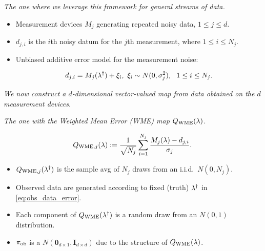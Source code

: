 \begin{frame}[t]{\it The one where we leverage this framework for general streams of data.}

\begin{itemize}
  \item Measurement devices $M_j$ generating repeated noisy data, $1\leq j\leq d$.

  \bigskip
  \item $d_{j,i}$ is the $i$th noisy datum for the $j$th measurement, where $1\leq i\leq N_j$.

  \bigskip
  \item Unbiased additive error model for the measurement noise:

  \begin{equation}\label{eq:obs_data_error}
  	d_{j,i} = M_j(\paramref) + \xi_i, \ \xi_i\sim N(0,\sigma_j^2), \ \ 1\leq i\leq N_j.
  \end{equation}

\end{itemize}

\bigskip
\bigskip
\centering
{\it We now construct a $d$-dimensional vector-valued map from data obtained on the $d$ measurement devices.}

\end{frame}


\begin{frame}[t]{\it The one with the Weighted Mean Error (WME) map $Q_\text{WME}(\lambda)$.}

\begin{equation}\label{eq:qoi_WME}
	Q_{\text{WME},j}(\lambda) := \frac{1}{\sqrt{N_j}} \sum_{i=1}^{N_j} \frac{M_j(\lambda)-d_{j,i}}{\sigma_j}.
\end{equation}

\bigskip
\begin{itemize}
  \item $Q_{\text{WME},j}(\lambda^\dagger)$ is the sample avg of $N_j$ draws from an i.i.d.~$N(0,N_j)$.

  \bigskip
  \item Observed data are generated according to fixed (truth) $\lambda^\dagger$ in \eqref{eq:obs_data_error}.

  \bigskip
  \item Each component of $Q_\text{WME}(\lambda^\dagger)$ is a random draw from an $N(0,1)$ distribution.

  \bigskip
  \item $\operatorname*{\pi_{ob}}$ is a $N(\mathbf{0}_{d\times 1},\mathbf{I}_{d\times d})$ due to the structure of $Q_\text{WME}(\lambda)$.

\end{itemize}


\end{frame}


